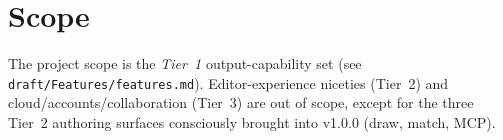 \section{Scope}
The project scope is the \emph{Tier~1} output-capability set (see
\texttt{draft/Features/features.md}). Editor-experience niceties (Tier~2) and
cloud/accounts/collaboration (Tier~3) are out of scope, except for the three
Tier~2 authoring surfaces consciously brought into v1.0.0 (draw, match, MCP).
